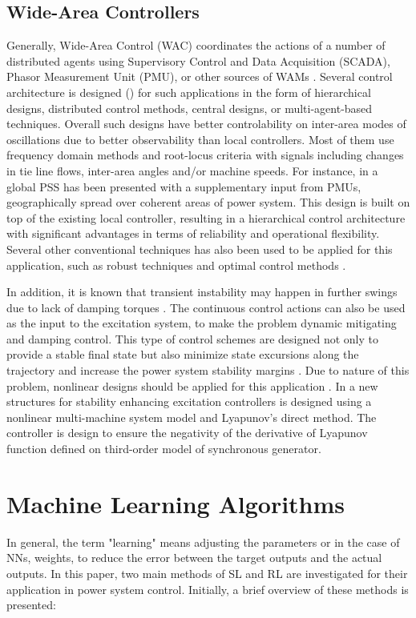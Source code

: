 \documentclass[journal]{IEEEtran}
\begin{document}
\subsection{Wide-Area Controllers}
Generally, Wide-Area Control (WAC) coordinates the actions of a number of distributed agents using Supervisory Control and Data Acquisition (SCADA), Phasor Measurement Unit (PMU), or other sources of WAMs \cite{Hadidi2011, 1645158,4075944}. Several control architecture is designed (\cite{1428002, 1664960, 1428011, 6204096}) for such applications in the form of hierarchical designs, distributed control methods, central designs, or multi-agent-based techniques. Overall such designs have better controlability on inter-area modes of oscillations due to better observability than local controllers. Most of them use frequency domain methods and root-locus criteria with signals including changes in tie line flows, inter-area angles and/or machine speeds. For instance, in \cite{910791} a global PSS has been presented with a supplementary input from PMUs, geographically spread over coherent areas of power system. This design is built on top of the existing local controller, resulting in a hierarchical control architecture with significant advantages in terms of reliability and operational flexibility. Several other conventional techniques has also been used to be applied for this application, such as robust techniques \cite{1137603} and optimal control methods \cite{dorjovchebulTPS14}. 



In addition, it is known that transient instability may happen in further swings due to lack of damping torques \cite{STBase}. The continuous control actions can also be used as the input to the excitation system, to make the problem dynamic mitigating and damping control. This type of control schemes are designed not only to provide a stable final state but also minimize state excursions along the trajectory and increase the power system stability margins \cite{6407495}. Due to nature of this problem, nonlinear designs should be applied for this application \cite{wang1997robust, 898110}. In \cite{898110} a new structures for stability enhancing excitation controllers is designed using a nonlinear multi-machine system model and Lyapunov's direct method. The controller is design to ensure the negativity of the derivative of Lyapunov function defined on third-order model of synchronous generator.

\vspace{-2mm}
\section{Machine Learning Algorithms}
In general, the term "learning" means adjusting the parameters or in the case of NNs, weights, to reduce the error between the target outputs and the actual outputs. In this paper, two main methods of SL and RL are investigated for their application in power system control. Initially, a brief overview of these methods is presented:
\end{document}
